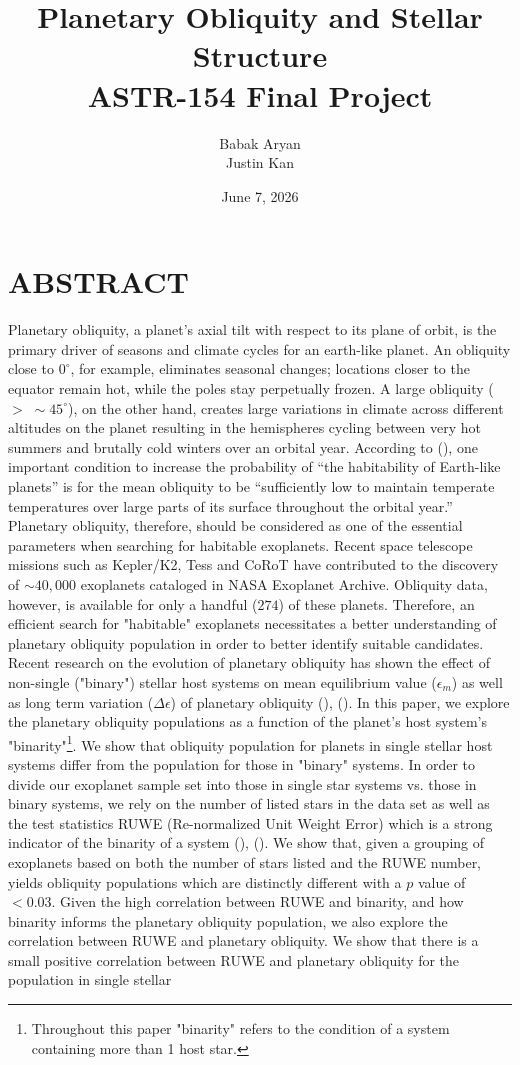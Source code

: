 \documentclass[fleqn]{article}
\title{\huge Planetary Obliquity and Stellar Structure \\ \Large ASTR-154 Final Project}
\date{June 7, 2026}
\author{Babak Aryan\\Justin Kan}
\begin{document}
	\maketitle

	\section*{ \centering \textbf{ABSTRACT}}
	
	Planetary obliquity, a planet’s axial tilt with respect to its plane of orbit, is the primary driver of seasons and climate cycles for an earth-like planet. An obliquity close to $0^\circ$, for example, eliminates seasonal changes; locations closer to the equator remain hot, while the poles stay perpetually frozen. A large obliquity ($> \; \sim\!45^\circ$), on the other hand, creates large variations in climate across different altitudes on the planet resulting in the hemispheres cycling between very hot summers and brutally cold winters over an orbital year.  According to (\cite{Vervoort}), one important condition to increase the probability of “the habitability of Earth-like planets” is for the mean obliquity to be “sufficiently low to maintain temperate temperatures over large parts of its surface throughout the orbital year.”  Planetary obliquity, therefore, should be considered as one of the essential parameters when searching for habitable exoplanets. Recent space telescope missions such as Kepler/K2, Tess and CoRoT have contributed to the discovery of $\sim40,000$ exoplanets cataloged in NASA Exoplanet Archive. Obliquity data, however, is available for only a handful ($274$) of these planets. Therefore, an efficient search for "habitable" exoplanets necessitates a better understanding of planetary obliquity population in order to better identify suitable candidates. Recent research on the evolution of planetary obliquity has shown the effect of non-single ("binary") stellar host systems on mean equilibrium value ($\epsilon_m$) as well as long term variation ($\Delta\epsilon$) of planetary obliquity (\cite{Huang}), (\cite{Quarles}).	In this paper, we explore the planetary obliquity populations as a function of the planet's host system's "binarity"\footnote{Throughout this paper "binarity" refers to the condition of a system containing more than 1 host star.}. We show that obliquity population for planets in single stellar host systems differ from the population for those in "binary" systems. In order to divide our exoplanet sample set into those in single star systems vs. those in binary systems, we rely on the number of listed stars in the data set as well as the test statistics RUWE (Re-normalized Unit Weight Error) which is a strong indicator of the binarity of a system (\cite{RUWE_Ginard}), (\cite{RUWE_Logan}). We show that, given a grouping of exoplanets based on both the number of stars listed and the RUWE number, yields obliquity populations which are distinctly different with a $p$ value of $< 0.03$. Given the high correlation between RUWE and binarity, and how binarity informs the planetary obliquity population, we also explore the correlation between RUWE and planetary obliquity. We show that there is a small positive correlation between RUWE and planetary obliquity for the population in single stellar 
\end{document}
